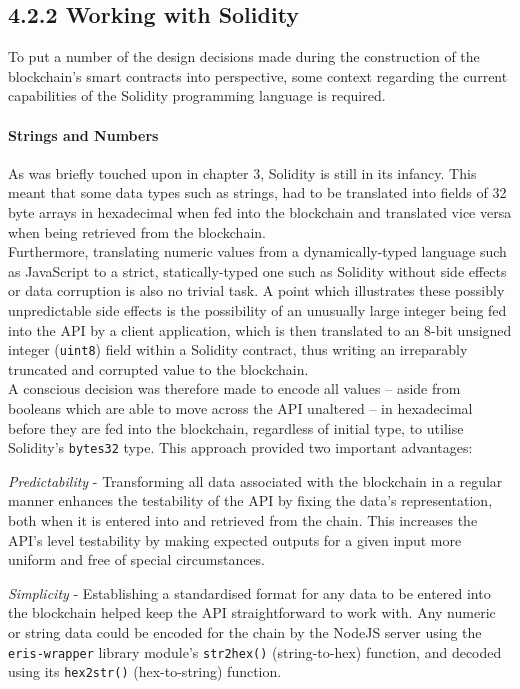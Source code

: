\subsection{4.2.2 Working with Solidity}\label{working-with-solidity}

To put a number of the design decisions made during the construction of
the blockchain's smart contracts into perspective, some context
regarding the current capabilities of the Solidity programming language
is required.

\paragraph{Strings and Numbers}\label{strings-and-numbers}

As was briefly touched upon in chapter 3, Solidity is still in its
infancy. This meant that some data types such as strings, had to be
translated into fields of 32 byte arrays in hexadecimal when fed into
the blockchain and translated vice versa when being retrieved from the
blockchain.\\
Furthermore, translating numeric values from a dynamically-typed
language such as JavaScript to a strict, statically-typed one such as
Solidity without side effects or data corruption is also no trivial
task. A point which illustrates these possibly unpredictable side
effects is the possibility of an unusually large integer being fed into
the API by a client application, which is then translated to an 8-bit
unsigned integer (\texttt{uint8}) field within a Solidity contract, thus
writing an irreparably truncated and corrupted value to the
blockchain.\\
A conscious decision was therefore made to encode all values -- aside
from booleans which are able to move across the API unaltered -- in
hexadecimal before they are fed into the blockchain, regardless of
initial type, to utilise Solidity's \texttt{bytes32} type. This approach
provided two important advantages:

\emph{Predictability} - Transforming all data associated with the
blockchain in a regular manner enhances the testability of the API by
fixing the data's representation, both when it is entered into and
retrieved from the chain. This increases the API's level testability by
making expected outputs for a given input more uniform and free of
special circumstances.

\emph{Simplicity} - Establishing a standardised format for any data to
be entered into the blockchain helped keep the API straightforward to
work with. Any numeric or string data could be encoded for the chain by
the NodeJS server using the \texttt{eris-wrapper} library module's
\texttt{str2hex()} (string-to-hex) function, and decoded using its
\texttt{hex2str()} (hex-to-string) function.


